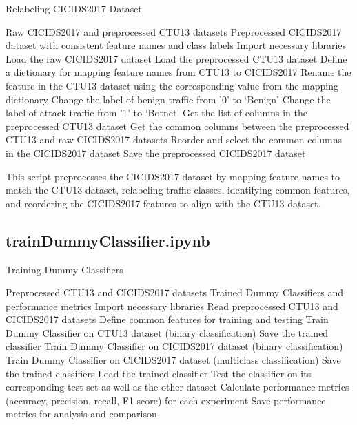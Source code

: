 \begin{algorithm}[H]
\caption{Relabeling CICIDS2017 Dataset}\label{alg:relabelCICIDS2017}
\begin{algorithmic}[1]
\Require%
Raw CICIDS2017 and preprocessed CTU13 datasets
\Ensure%
Preprocessed CICIDS2017 dataset with consistent feature names and class labels
\State%
Import necessary libraries
\State%
Load the raw CICIDS2017 dataset
\State%
Load the preprocessed CTU13 dataset
\State%
Define a dictionary for mapping feature names from CTU13 to CICIDS2017
        \State%
        Rename the feature in the CTU13 dataset using the corresponding value from the mapping dictionary
    \EndIf%
\EndFor%
\State%
Change the label of benign traffic from '0' to `Benign'
\State%
Change the label of attack traffic from '1' to `Botnet'
\State%
Get the list of columns in the preprocessed CTU13 dataset
\State%
Get the common columns between the preprocessed CTU13 and raw CICIDS2017 datasets
\State%
Reorder and select the common columns in the CICIDS2017 dataset
\State%
Save the preprocessed CICIDS2017 dataset
\end{algorithmic}
\end{algorithm}

This script preprocesses the CICIDS2017 dataset by mapping feature names to match the CTU13 dataset, relabeling traffic classes, identifying common features, and reordering the CICIDS2017 features to align with the CTU13 dataset.

\subsection{trainDummyClassifier.ipynb}\label{subsec:trainDummyClassifier.ipynb}

\begin{algorithm}[H]
\caption{Training Dummy Classifiers}\label{alg:trainDummyClassifier}
\begin{algorithmic}[1]
\Require%
Preprocessed CTU13 and CICIDS2017 datasets
\Ensure%
Trained Dummy Classifiers and performance metrics
\State%
Import necessary libraries  
\State%
Read preprocessed CTU13 and CICIDS2017 datasets
\State%
Define common features for training and testing
        \State%
        Train Dummy Classifier on CTU13 dataset (binary classification)
        \State%
        Save the trained classifier
        \State%
        Train Dummy Classifier on CICIDS2017 dataset (binary classification)
        \State%
        Train Dummy Classifier on CICIDS2017 dataset (multiclass classification)
        \State%
        Save the trained classifiers
    \EndIf%
\EndFor%
    \State%
    Load the trained classifier
    \State%
    Test the classifier on its corresponding test set as well as the other dataset
    \State%
    Calculate performance metrics (accuracy, precision, recall, F1 score) for each experiment
    \State%
    Save performance metrics for analysis and comparison
\EndFor%
\end{algorithmic}
\end{algorithm}

